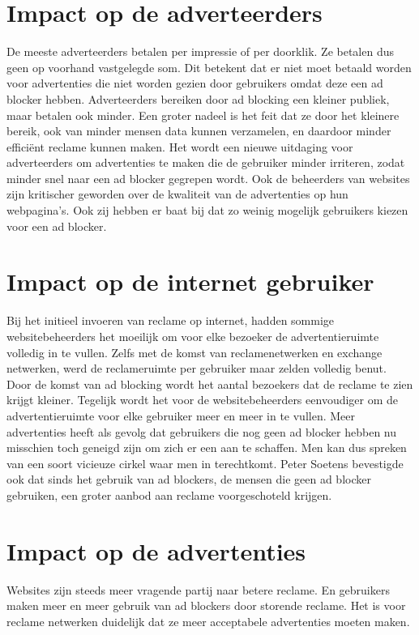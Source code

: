 \documentclass[pdftex,a4paper,12pt,twoside]{report}
\begin{document}
\section{Impact op de adverteerders}
\label{sec:Impact op de adverteerders}
De meeste adverteerders betalen per impressie of per doorklik. Ze betalen dus geen op voorhand vastgelegde som. Dit betekent dat er niet moet betaald worden voor advertenties die niet worden gezien door gebruikers omdat deze een ad blocker hebben. Adverteerders bereiken door ad blocking een kleiner publiek, maar betalen ook minder. 
Een groter nadeel is het feit dat ze door het kleinere bereik, ook van minder mensen data kunnen verzamelen, en daardoor minder efficiënt reclame kunnen maken.
Het wordt een nieuwe uitdaging voor adverteerders om advertenties te maken die de gebruiker minder irriteren, zodat minder snel naar een ad blocker gegrepen wordt.
Ook de beheerders van websites zijn kritischer geworden over de kwaliteit van de advertenties op hun webpagina’s. Ook zij hebben er baat bij dat zo weinig mogelijk gebruikers kiezen voor een ad blocker.

\section{Impact op de internet gebruiker}
\label{sec:Impact op de internet gebruiker}
Bij het initieel invoeren van reclame op internet, hadden sommige websitebeheerders het moeilijk om voor elke bezoeker de advertentieruimte volledig in te vullen. Zelfs met de komst van reclamenetwerken en exchange netwerken, werd de reclameruimte per gebruiker maar zelden volledig benut. Door de komst van ad blocking wordt het aantal bezoekers dat de reclame te zien krijgt kleiner.  Tegelijk wordt het voor de websitebeheerders eenvoudiger om de advertentieruimte voor elke gebruiker meer en meer in te vullen. Meer advertenties heeft als gevolg dat gebruikers die nog geen ad blocker hebben nu misschien toch geneigd zijn om zich er een aan te schaffen. Men kan dus spreken van een soort vicieuze cirkel waar men in terechtkomt.
Peter Soetens bevestigde ook dat sinds het gebruik van ad blockers, de mensen die geen ad blocker gebruiken, een groter aanbod aan reclame voorgeschoteld krijgen.

\section{Impact op de advertenties}
\label{sec:Impact op de advertenties}
Websites zijn steeds meer vragende partij naar betere reclame. En gebruikers maken meer en meer gebruik van ad blockers door storende reclame. Het is voor reclame netwerken duidelijk dat ze meer acceptabele advertenties moeten maken.
\end{document}
